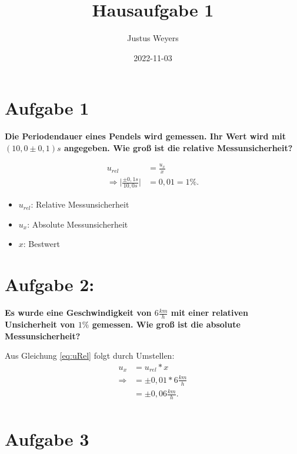 \documentclass[
]{article}
\title{Hausaufgabe 1}
\author{Justus Weyers}
\date{2022-11-03}
\begin{document}
\maketitle

\hypertarget{aufgabe-1}{%
\section{Aufgabe 1}\label{aufgabe-1}}

\textbf{Die Periodendauer eines Pendels wird gemessen. Ihr Wert wird mit
\((10,0 \pm 0,1)s\) angegeben. Wie groß ist die relative
Messunsicherheit?}

\begin{equation}\label{eq:uRel}
  \begin{split}
    u_{rel} &= \frac{u_x}{x} \\
    \Rightarrow \vert\frac{\pm0,1s}{10,0s}\vert & = 0,01 = 1\%.
  \end{split}
\end{equation}

\begin{itemize}
  \item  $u_{rel}$: Relative Messunsicherheit
  \item  $u_x$: Absolute Messunsicherheit
  \item  $x$: Bestwert
\end{itemize}

\hypertarget{aufgabe-2}{%
\section{Aufgabe 2:}\label{aufgabe-2}}

\textbf{Es wurde eine Geschwindigkeit von \(6 \frac{km}{h}\) mit einer
relativen Unsicherheit von \(1 \%\) gemessen. Wie groß ist die absolute
Messunsicherheit?}

Aus Gleichung \ref{eq:uRel} folgt durch Umstellen:
\begin{equation}\label{eq:uAbs}
  \begin{split}
            u_x &= u_{rel}*x \\
    \Rightarrow & = \pm 0,01 * 6 \frac{km}{h}\\
                &= \pm 0,06 \frac{km}{h}.\\
  \end{split}
\end{equation}

\hypertarget{aufgabe-3}{%
\section{Aufgabe 3}\label{aufgabe-3}}
\end{document}
